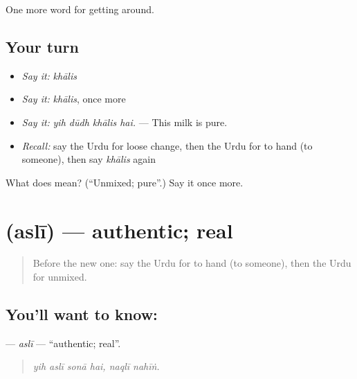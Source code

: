 \begin{grammarlens}[title={What you've built}]
One more word for getting around.
\end{grammarlens}

\subsection*{Your turn}
\begin{itemize}
\raggedright
  \item \emph{Say it:} \emph{khālis}
  \item \emph{Say it:} \emph{khālis}, once more
  \item \emph{Say it:} \emph{yih dūdh khālis hai.} — This milk is pure.
  \item \emph{Recall:} say the Urdu for loose change, then the Urdu for to hand (to someone), then say \emph{khālis} again
\end{itemize}

\begin{tcolorbox}[breakable,colback=teal!4,colframe=teal!35!black,title={Before you move on}]
What does  mean? (\textquotedblleft{}Unmixed; pure\textquotedblright{}.) Say it once more.
\end{tcolorbox}
\section[\texorpdfstring{\ur{اصلی} (aslī)}{اصلی (aslī)}]{ (aslī) — authentic; real}

\label{lesson:UR-C426-asli}



\begin{quote}
Before the new one: say the Urdu for to hand (to someone), then the Urdu for unmixed.
\end{quote}

\subsection*{You'll want to know: }
\textbf{} — \emph{aslī} — \textquotedblleft{}authentic; real\textquotedblright{}.

\begin{quote}
     
\end{quote}

\begin{quote}
\emph{yih aslī sonā hai, naqlī nahīṅ.}
\end{quote}

